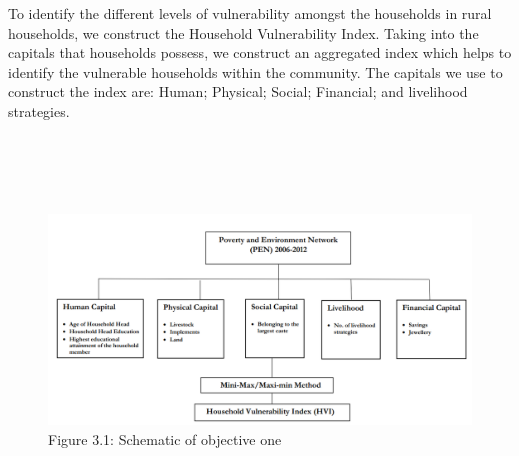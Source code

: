 \documentclass[12pt, a4paper]{article}
\begin{document}
To identify the different levels of vulnerability amongst the households in rural households, we construct the Household Vulnerability Index. Taking into the capitals that households possess, we construct an aggregated index which helps to identify the vulnerable households within the community. The capitals we use to construct the index are: Human; Physical; Social; Financial; and livelihood strategies.  
 \\
 \\
 \\
 \\
 \\
\begin{figure}[H]
	\centering
	\includegraphics[scale=0.8]{Conceptual framework for Household Vulnerability Index1.png}
	\captionsetup{labelformat=empty}
	\caption{Figure 3.1: Schematic of objective one} 
	\label{fig:conceptualfw1}
\end{figure}
\end{document}
